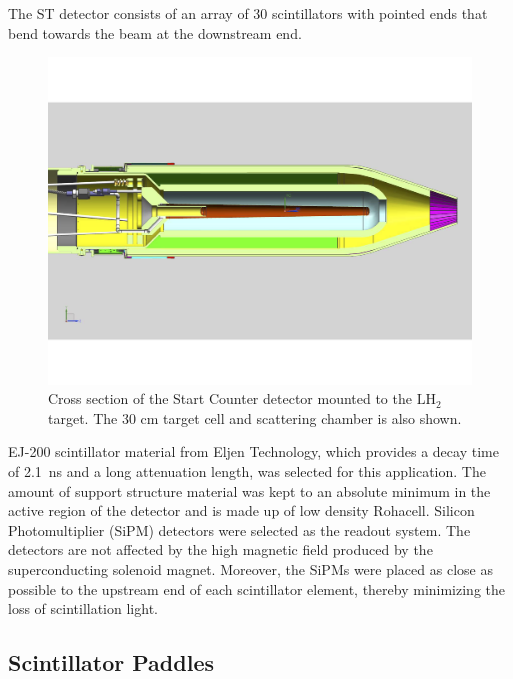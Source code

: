 The ST detector consists of an array of 30 scintillators with pointed ends that bend towards the beam at the downstream end. 
	\begin{figure}[!htb]
		\centering
		\includegraphics[width=1.0\columnwidth]{design/figs/st_target_cs}
		\caption{Cross section of the Start Counter detector mounted to the $\mathrm{LH_2}$ target. The 30 cm target cell and scattering chamber is also shown.}
		\label{fig:sttargetcs}
	\end{figure}
EJ-200 scintillator material from Eljen Technology\cite{eljen}, which provides a decay time of 2.1~ns and a long attenuation length\cite{ej200_specs}, was selected for this application.  The amount of support structure material was kept to an absolute minimum in the active region of the detector and is made up of low density Rohacell\cite{rohacell}. Silicon Photomultiplier (SiPM) detectors were selected as the readout system. The detectors are not affected by the high magnetic field produced by the superconducting solenoid magnet. Moreover, the SiPMs were placed as close as possible to the upstream end of each scintillator element, thereby minimizing the loss of scintillation light\cite{pooser16}.

\subsection{Scintillator Paddles} \label{sec:design_paddles}

